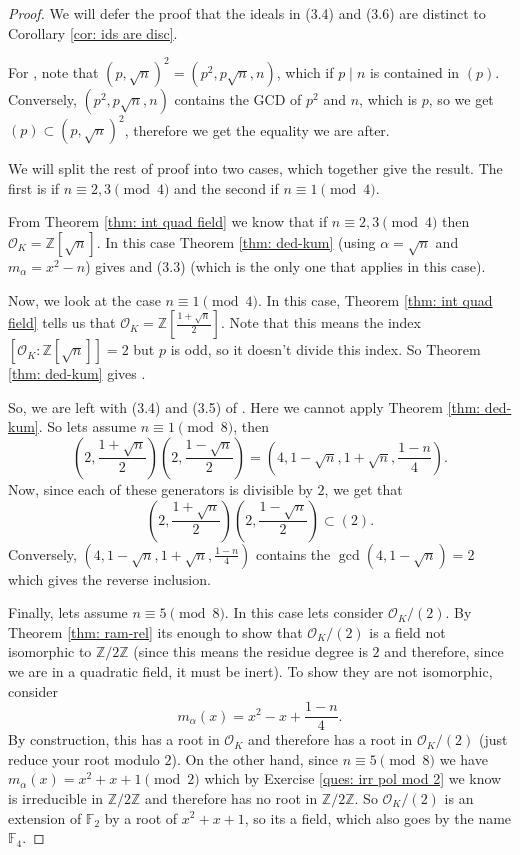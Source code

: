 \documentclass[11pt,a4paper]{report}
\theoremstyle{plain}
\theoremstyle{definition}
\theoremstyle{definition}
\newcommand{\ZZ}{\mathbb{Z}}
\def\FF{\mathbb{F}}
\def \a{\alpha}
\def \OO {\mathcal{O}}
\begin{document}
\begin{proof}
	
	We will defer the proof that the ideals in  (3.4) and (3.6)	are distinct to Corollary \ref{cor: ids are disc}.
	
	For \faShip, note that $(p,\sqrt{n})^2=(p^2,p\sqrt{n},n)$, which if $p \mid n$ is contained in $(p)$. Conversely,	$(p^2,p\sqrt{n},n)$ contains the GCD of $p^2$ and $n$, which is $p$, so we get $(p) \subset (p,\sqrt{n})^2$, therefore we get the equality we are after.
	
	We will split the rest of proof into two cases, which together give the result. The first is if $n \equiv 2,3 \pmod 4$ and the second if $n \equiv 1 \pmod 4$.	
	
	From Theorem \ref{thm: int quad field} we know that if $n \equiv 2,3 \pmod 4$ then $\OO_K=\ZZ[\sqrt{n}]$. In this case Theorem \ref{thm: ded-kum} (using $\a=\sqrt{n}$ and $m_\a=x^2-n$) gives \faKey and (3.3) (which is the only one that applies in this case).
	
	Now, we look at the case $n \equiv 1 \pmod 4$. In this case, Theorem \ref{thm: int quad field} tells us that $\OO_K=\ZZ[\frac{1+\sqrt{n}}{2}]$. Note that this means the index $[\OO_K:\ZZ[\sqrt{n}]]=2$ but $p$ is odd, so it doesn't divide this index. So Theorem \ref{thm: ded-kum}  gives \faKey.
	
	So, we are left with (3.4) and (3.5) of \faLeaf. Here we cannot apply Theorem \ref{thm: ded-kum}. So lets assume $n \equiv 1 \pmod 8$, then  \[ 	\left (2,\frac{1+\sqrt{n}}{2}\right )\left (2,\frac{1-\sqrt{n}}{2}\right )=\left(4,1-\sqrt{n},1+\sqrt{n},\frac{1-n}{4}\right).\]  Now, since each of these generators is divisible by $2$, we get that  	\[\left(2,\frac{1+\sqrt{n}}{2}\right)\left(2,\frac{1-\sqrt{n}}{2}\right) \subset (2).\] Conversely, $\left(4,1-\sqrt{n},1+\sqrt{n},\frac{1-n}{4}\right)$ contains the $\gcd(4,1-\sqrt{n})=2$ which gives the reverse inclusion. 
	
	Finally, lets assume $n \equiv 5 \pmod 8$. In this case lets consider $\OO_K/(2)$. By Theorem \ref{thm: ram-rel} its enough to show that $\OO_K/(2)$ is a field not isomorphic to $\ZZ/2\ZZ$ (since this means the residue degree is $2$ and therefore, since we are in a quadratic field, it must be inert). To show they are not isomorphic, consider \[m_\a(x)=x^2-x+\frac{1-n}{4}.\] By construction, this has a root in $\OO_K$ and therefore has a root in $\OO_K/(2)$ (just reduce your root modulo $2$). On the other hand, since $n \equiv 5 \pmod 8$ we have $m_\a(x)=x^2+x+1 \pmod 2$ which by  Exercise \ref{ques: irr pol mod 2} we know is irreducible in $\ZZ/2\ZZ$ and therefore has no root in $\ZZ/2\ZZ$. So $\OO_K/(2)$ is an extension of $\FF_2$ by a root of $x^2+x+1$, so its a field, which also goes by the name $\FF_4$. 
	
	
	
	
\end{proof}
\end{document}
